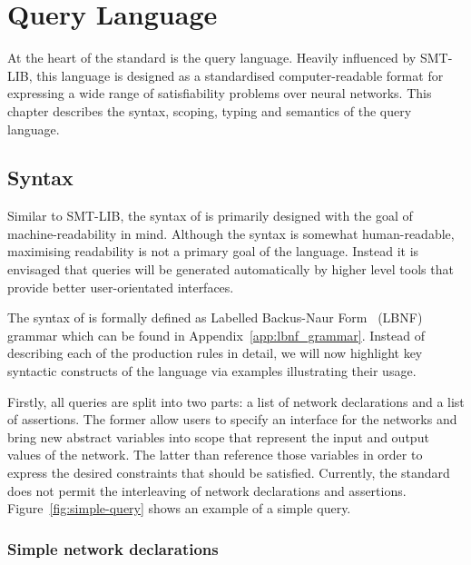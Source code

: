 \chapter{Query Language}\label{sec:specification_language}

At the heart of the \vnnlib{} standard is the \vnnlib{} query language. Heavily influenced by SMT-LIB, this language is designed as a standardised computer-readable format for expressing a wide range of satisfiability problems over neural networks. This chapter describes the syntax, scoping, typing and semantics of the query language.

\section{Syntax}
\label{sec:syntax}


Similar to SMT-LIB, the syntax of \vnnlib{} is primarily designed with the goal of machine-readability in mind. Although the syntax is somewhat human-readable, maximising readability is not a primary goal of the language. Instead it is envisaged that \vnnlib{} queries will be generated automatically by higher level tools that provide better user-orientated interfaces.

The syntax of \vnnlib{} is formally defined as Labelled Backus-Naur Form~\cite{forsberg2005labelled} (LBNF) grammar which can be found in Appendix~\ref{app:lbnf_grammar}. Instead of describing each of the production rules in detail, we will now highlight key syntactic constructs of the language via examples illustrating their usage.

Firstly, all \vnnlib{} queries are split into two parts: a list of network declarations and a list of assertions. The former allow users to specify an interface for the networks and bring new abstract variables into scope that represent the input and output values of the network. The latter than reference those variables in order to express the desired constraints that should be satisfied. Currently, the standard does not permit the interleaving of network declarations and assertions. Figure~\ref{fig:simple-query} shows an example of a simple query.

\subsection{Simple network declarations}
\label{sec:network-declarations}

